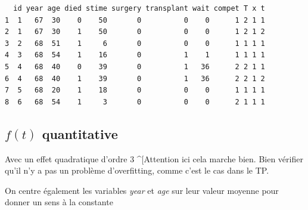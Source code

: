 \documentclass[
  12pt,
  letterpaper,
  DIV=11,
  numbers=noendperiod,
  onepage,
  openany]{scrreprt}
\newenvironment{Shaded}{\begin{snugshade}}{\end{snugshade}}
\newcommand{\AttributeTok}[1]{\textcolor[rgb]{0.80,0.80,0.80}{#1}}
\newcommand{\DecValTok}[1]{\textcolor[rgb]{0.86,0.86,0.80}{#1}}
\newcommand{\FunctionTok}[1]{\textcolor[rgb]{0.94,0.94,0.56}{#1}}
\newcommand{\NormalTok}[1]{\textcolor[rgb]{0.80,0.80,0.80}{#1}}
\newcommand{\OtherTok}[1]{\textcolor[rgb]{0.94,0.94,0.56}{#1}}
\newcommand{\SpecialCharTok}[1]{\textcolor[rgb]{0.86,0.64,0.64}{#1}}
\begin{document}
\begin{Shaded}
\end{Shaded}

\begin{verbatim}
  id year age died stime surgery transplant wait compet T x t
1  1   67  30    0    50       0          0    0      1 2 1 1
2  1   67  30    1    50       0          0    0      1 2 1 2
3  2   68  51    1     6       0          0    0      1 1 1 1
4  3   68  54    1    16       0          1    1      1 1 1 1
5  4   68  40    0    39       0          1   36      2 2 1 1
6  4   68  40    1    39       0          1   36      2 2 1 2
7  5   68  20    1    18       0          0    0      1 1 1 1
8  6   68  54    1     3       0          0    0      2 1 1 1
\end{verbatim}

\hypertarget{ft-quantitative}{%
\subsection{\texorpdfstring{\textbf{\(f(t)\)
quantitative}}{f(t) quantitative}}\label{ft-quantitative}}

Avec un effet quadratique d'ordre 3 \^{}{[}Attention ici cela marche
bien. Bien vérifier qu'il n'y a pas un problème d'overfitting, comme
c'est le cas dans le TP.

On centre également les variables \emph{year} et \emph{age} sur leur
valeur moyenne pour donner un sens à la constante
\end{document}
